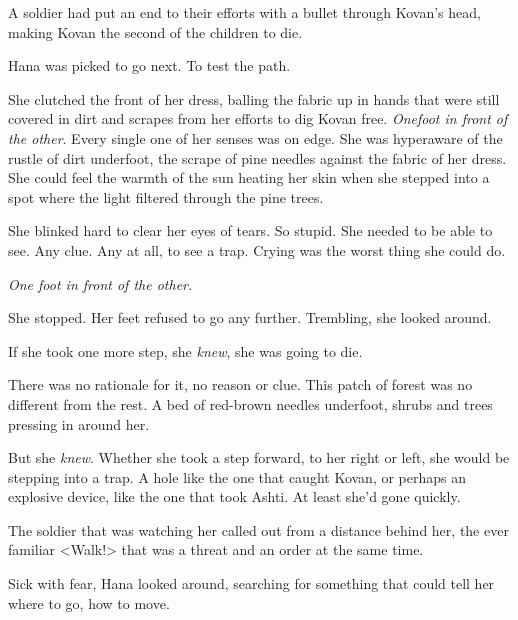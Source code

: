 A soldier had put an end to their efforts with a bullet through Kovan's head, making Kovan the second of the children to die.



Hana was picked to go next.  To test the path.



She clutched the front of her dress, balling the fabric up in hands that were still covered in dirt and scrapes from her efforts to dig Kovan free.  \emph{One}\emph{foot in front of the other}.   Every single one of her senses was on edge.  She was hyperaware of the rustle of dirt underfoot, the scrape of pine needles against the fabric of her dress.  She could feel the warmth of the sun heating her skin when she stepped into a spot where the light filtered through the pine trees.



She blinked hard to clear her eyes of tears.  So stupid.  She needed to be able to see.  Any clue.  Any at all, to see a trap.  Crying was the worst thing she could do.



\emph{One foot in front of the other.}



She stopped.  Her feet refused to go any further.  Trembling, she looked around.



If she took one more step, she \emph{knew}, she was going to die.



There was no rationale for it, no reason or clue.  This patch of forest was no different from the rest.  A bed of red-brown needles underfoot, shrubs and trees pressing in around her.



But she \emph{knew}. \emph{ }Whether she took a step forward, to her right or left, she would be stepping into a trap.  A hole like the one that caught Kovan, or perhaps an explosive device, like the one that took Ashti.  At least she'd gone quickly.



The soldier that was watching her called out from a distance behind her, the ever familiar <Walk!> that was a threat and an order at the same time.



Sick with fear, Hana looked around, searching for something that could tell her where to go, how to move.



